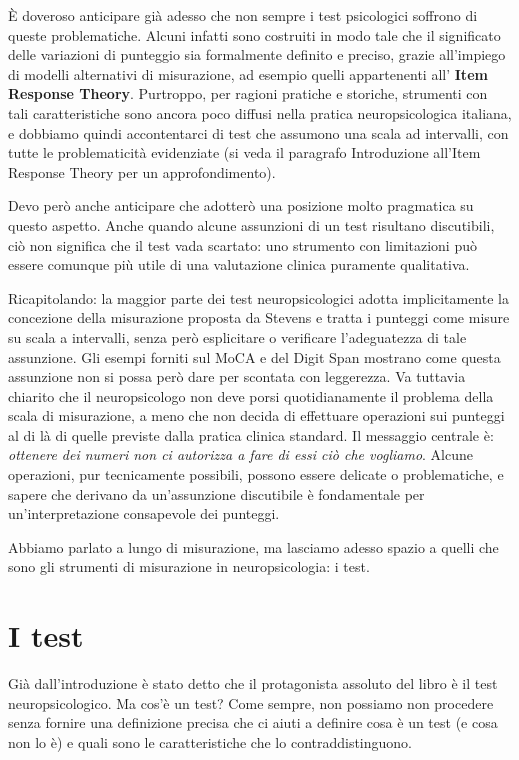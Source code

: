\documentclass[
  italian,
  letterpaper,
  paper=A4,
  headinclude=on,
  footinclude=on,
  12pt]{scrbook}
\begin{document}
È doveroso anticipare già adesso che non sempre i test psicologici
soffrono di queste problematiche. Alcuni infatti sono costruiti in modo
tale che il significato delle variazioni di punteggio sia formalmente
definito e preciso, grazie all'impiego di modelli alternativi di
misurazione, ad esempio quelli appartenenti all' \textbf{Item Response
Theory}. Purtroppo, per ragioni pratiche e storiche, strumenti con tali
caratteristiche sono ancora poco diffusi nella pratica neuropsicologica
italiana, e dobbiamo quindi accontentarci di test che assumono una scala
ad intervalli, con tutte le problematicità evidenziate (si veda il
paragrafo Introduzione all'Item Response Theory per un approfondimento).

Devo però anche anticipare che adotterò una posizione molto pragmatica
su questo aspetto. Anche quando alcune assunzioni di un test risultano
discutibili, ciò non significa che il test vada scartato: uno strumento
con limitazioni può essere comunque più utile di una valutazione clinica
puramente qualitativa.

Ricapitolando: la maggior parte dei test neuropsicologici adotta
implicitamente la concezione della misurazione proposta da Stevens e
tratta i punteggi come misure su scala a intervalli, senza però
esplicitare o verificare l'adeguatezza di tale assunzione. Gli esempi
forniti sul MoCA e del Digit Span mostrano come questa assunzione non si
possa però dare per scontata con leggerezza. Va tuttavia chiarito che il
neuropsicologo non deve porsi quotidianamente il problema della scala di
misurazione, a meno che non decida di effettuare operazioni sui punteggi
al di là di quelle previste dalla pratica clinica standard. Il messaggio
centrale è: \emph{ottenere dei numeri non ci autorizza a fare di essi
ciò che vogliamo}. Alcune operazioni, pur tecnicamente possibili,
possono essere delicate o problematiche, e sapere che derivano da
un'assunzione discutibile è fondamentale per un'interpretazione
consapevole dei punteggi.

Abbiamo parlato a lungo di misurazione, ma lasciamo adesso spazio a
quelli che sono gli strumenti di misurazione in neuropsicologia: i test.

\section{I test}\label{i-test}

Già dall'introduzione è stato detto che il protagonista assoluto del
libro è il test neuropsicologico. Ma cos'è un test? Come sempre, non
possiamo non procedere senza fornire una definizione precisa che ci
aiuti a definire cosa è un test (e cosa non lo è) e quali sono le
caratteristiche che lo contraddistinguono.
\end{document}
